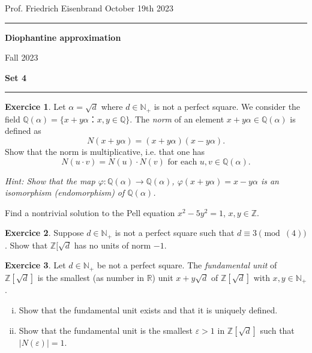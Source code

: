 \documentclass[12pt,a4paper]{article}
\date{}
\theoremstyle{plain}
\newtheorem*{Sol*}{Solution}
\theoremstyle{definition}
\newtheorem{Ex}{Exercice}
\newif\ifsolutions
\newcommand{\exercise}[2]{
			\begin{Ex} #1 \end{Ex}
			\ifsolutions  \begin{Sol*} #2 \end{Sol*} \bigskip \else \bigskip  \fi
		}
\begin{document}
\begin{center}
{Prof. Friedrich Eisenbrand \hfill October 19th 2023}
\end{center}
	
\hrule\vspace{\baselineskip}

\begin{center}
\textbf{Diophantine approximation}

Fall 2023

\bigskip

\textbf{Set 4}
\ifsolutions{\textbf{- Solutions}} \else{} \fi
\end{center}

\hrule\vspace{\baselineskip}



\exercise{ Let $α = \sqrt{d}$ where $d ∈ ℕ_+$ is not a perfect square. We consider the field $ℚ(α) = \{ x + y α ： x, y ∈ℚ \}$.  The \emph{norm} of an element $x +  y α ∈ ℚ(α)$ is defined as
  \begin{displaymath}
    N(x +  y α) = (x +  y α)(x -  y α). 
  \end{displaymath}
  Show that the norm is multiplicative, i.e. that one has
  \begin{displaymath}
    N(u⋅v) = N(u)⋅N(v) \text{ for each } u,v ∈ℚ(α). 
  \end{displaymath}

{\bigskip \noindent  \small \emph{ Hint: Show that the map $φ: ℚ(α) → ℚ(α)$, $φ( x + y α ) =  x - y α $ is an isomorphism (endomorphism) of $ℚ(α)$.} }
}


\exercise{Find a nontrivial  solution to the Pell equation $x^2 - 5 y^2 =1$, $x,y ∈ ℤ$.}{}

\exercise{Suppose $d ∈ℕ_+$ is not a perfect square such that $d ≡ 3 \pmod(4)$. Show that $ℤ[\sqrt{d}$ has no units of norm $-1$. }{}


\exercise{Let $d ∈ ℕ_+$ be not a perfect square. The \emph{fundamental unit} of $ℤ[\sqrt{d}]$ is the smallest (as number in $ℝ$) unit $x + y \sqrt{d}$ of $ℤ[\sqrt{d}]$ with $x,y ∈ℕ_+$.

\bigskip 

\noindent
\begin{enumerate}[i)]
\item 
  Show that the fundamental unit exists and that it is uniquely defined.
\item Show that the fundamental unit is the smallest $ε>1$ in $ℤ[\sqrt{d}]$ such that $|N(ε)| =  1$. 
\end{enumerate}
}{}
\end{document}
